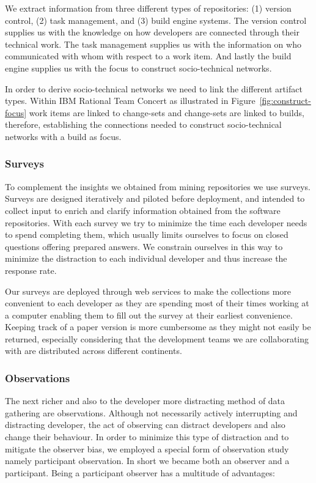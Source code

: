 We extract information from three different types of repositories: (1) version control, (2) task management, and (3) build engine systems.
The version control supplies us with the knowledge on how developers are connected through their technical work.
The task management supplies us with the information on who communicated with whom with respect to a work item.
And lastly the build engine supplies us with the focus to construct socio-technical networks.

In order to derive socio-technical networks we need to link the different artifact types.
Within IBM Rational Team Concert as illustrated in Figure~\ref{fig:construct-focus} work items are linked to change-sets and change-sets are linked to builds, therefore, establishing the connections needed to construct socio-technical networks with a build as focus.

\subsubsection{Surveys}
To complement the insights we obtained from mining repositories we use surveys.
Surveys are designed iteratively and piloted before deployment, and intended to collect input to enrich and clarify information obtained from the software repositories. 
With each survey we try to minimize the time each developer needs to spend completing them, which usually limits ourselves to focus on closed questions offering prepared answers.
We constrain ourselves in this way to minimize the distraction to each individual developer and thus increase the response rate.

Our surveys are deployed through web services to make the collections more convenient to each developer as they are spending most of their times working at a computer enabling them to fill out the survey at their earliest convenience.
Keeping track of a paper version is more cumbersome as they might not easily be returned, especially considering that the development teams we are collaborating with are distributed across different continents.


\subsubsection{Observations}
The next richer and also to the developer more distracting method of data gathering are observations.
Although not necessarily actively interrupting and distracting developer, the act of observing can distract developers and also change their behaviour.
In order to minimize this type of distraction and to mitigate the observer bias, we employed a special form of observation study namely participant observation.
In short we became both an observer and a participant.
%
Being a participant observer has a multitude of advantages:

